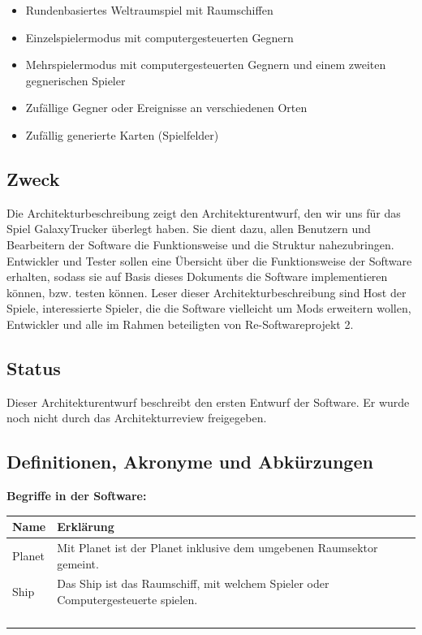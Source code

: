 \documentclass[fontsize=12pt,paper=a4,twoside]{scrartcl}
\begin{document}
\begin{itemize}
\item{Rundenbasiertes Weltraumspiel mit Raumschiffen}
\item{Einzelspielermodus mit computergesteuerten Gegnern}
\item{Mehrspielermodus mit computergesteuerten Gegnern und einem zweiten gegnerischen Spieler}
\item{Zufällige Gegner oder Ereignisse an verschiedenen Orten}
\item{Zufällig generierte Karten (Spielfelder)}
\end{itemize}



\subsection{Zweck}

Die Architekturbeschreibung zeigt den Architekturentwurf, den wir uns für das Spiel GalaxyTrucker überlegt haben. Sie dient dazu, allen Benutzern und Bearbeitern der Software die Funktionsweise und die Struktur nahezubringen. Entwickler und Tester sollen eine Übersicht über die Funktionsweise der Software erhalten, sodass sie auf Basis dieses Dokuments die Software implementieren können, bzw. testen können. 
Leser dieser Architekturbeschreibung sind Host der Spiele, interessierte Spieler, die die Software vielleicht um Mods erweitern wollen, Entwickler und alle im Rahmen beteiligten von Re-Softwareprojekt 2. 

\subsection{Status}

Dieser Architekturentwurf beschreibt den ersten Entwurf der Software. Er wurde noch nicht durch das Architekturreview freigegeben. 
  
\subsection{Definitionen, Akronyme und Abkürzungen}

\textbf{Begriffe in der Software:}
\begin{table}[]
\begin{tabular}{|l|l|}
\hline
Name & Erklärung \\ \hline
Planet & Mit Planet ist der Planet inklusive dem umgebenen Raumsektor gemeint. \\ \hline
Ship & Das Ship ist das Raumschiff, mit welchem Spieler oder Computergesteuerte spielen. \\ \hline
 & \\ \hline
 & \\ \hline
 & \\ \hline
 & \\ \hline
\end{tabular}
\end{table}
\end{document}
